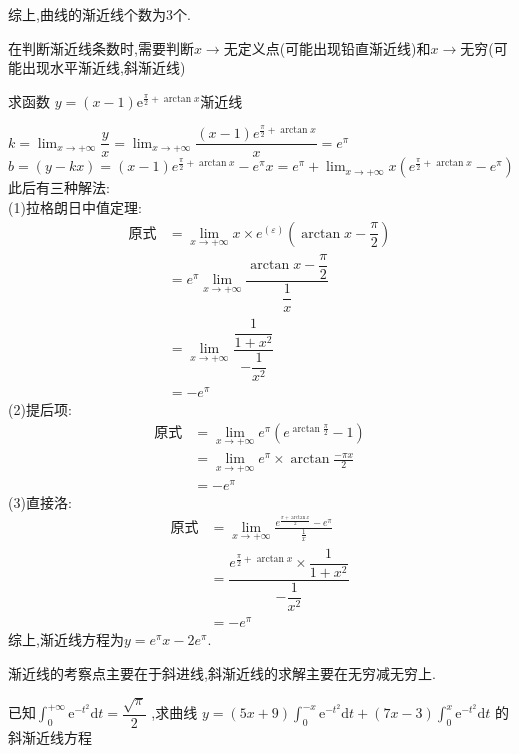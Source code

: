 \documentclass[8pt a4paper, oneside, UTF8]{ctexbook}  %
\begin{document}
\begin{sloppypar}
\begin{solution}
        综上,曲线的渐近线个数为3个.
    \end{solution}
    \begin{note}
        在判断渐近线条数时,需要判断$x\to \text{无定义点}$(可能出现铅直渐近线)和$x\to \text{无穷}$(可能出现水平渐近线,斜渐近线)
    \end{note}
    \begin{problem}
    求函数 $y=( x-1 ) \mathrm{e}^{\frac{\pi} {2}+\arctan x}$渐近线
    \end{problem}
    \begin{solution}
        $k=\lim_{x\to+\infty}\dfrac{y}{x}=\lim_{x\to+\infty}\dfrac{(x-1)e^{\frac{\pi}{2}+\arctan x}}{x}=e^\pi$\\
        $b=(y-kx)=(x-1)e^{\frac{\pi}{2}+\arctan x}-e^\pi x=e^\pi+\lim_{x\to +\infty}x(e^{\frac{\pi}{2}+\arctan x}-e^\pi) $\\
        此后有三种解法:\\
        (1)拉格朗日中值定理:
        \begin{align*}
            \text{原式} & = \lim_{x\to +\infty}x\times e^{(\varepsilon)}(\arctan x -\dfrac{\pi}{2}) \\
                      & = e^{\pi} \lim_{x\to +\infty}\dfrac{\arctan x -\dfrac{\pi}{2}}{\dfrac1x}  \\
                      & =\lim_{x\to +\infty} \dfrac{\dfrac{1}{1+x^2}}{-\dfrac{1}{x^2}}            \\
                      & =-e^\pi
        \end{align*}
        (2)提后项:
        \begin{align*}
            \text{原式} & = \lim_{x\to +\infty}e^\pi(e^{\arctan \frac{\pi}{2}}-1) \\
                      & =\lim_{x\to +\infty}e^\pi\times\arctan \frac{-\pi x}{2} \\
                      & =-e^\pi
        \end{align*}
        (3)直接洛:
        \begin{align*}
            \text{原式} & = \lim_{x\to +\infty}\frac{e^{\frac{\pi+\arctan x}{2}}-e^\pi}{\frac{1}{x}}       \\
                      & = \dfrac{e^{\frac{\pi}{2}+\arctan x}\times\dfrac{1}{1+x^{2}}}{-\dfrac{1}{x^{2}}} \\
                      & = -e^\pi
        \end{align*}
        综上,渐近线方程为$y=e^\pi x-2e^\pi.$
    \end{solution}
    \begin{note}
        渐近线的考察点主要在于斜进线,斜渐近线的求解主要在无穷减无穷上.
    \end{note}
    \begin{problem}
    已知$\int_{0}^{+\infty} \mathrm{e}^{-t^{2}} \mathrm{d} t={\dfrac{\sqrt{\pi}} {2}}$ ,求曲线 $y=( 5 x+9 ) \int_{0}^{-x} \mathrm{e}^{-t^{2}} \mathrm{d} t+( 7 x-3 ) \int_{0}^{x} \mathrm{e}^{-t^{2}} \mathrm{d} t$ 的斜渐近线方程
    \end{problem}
    \begin{solution}


\end{solution}
\end{sloppypar}
\end{document}
